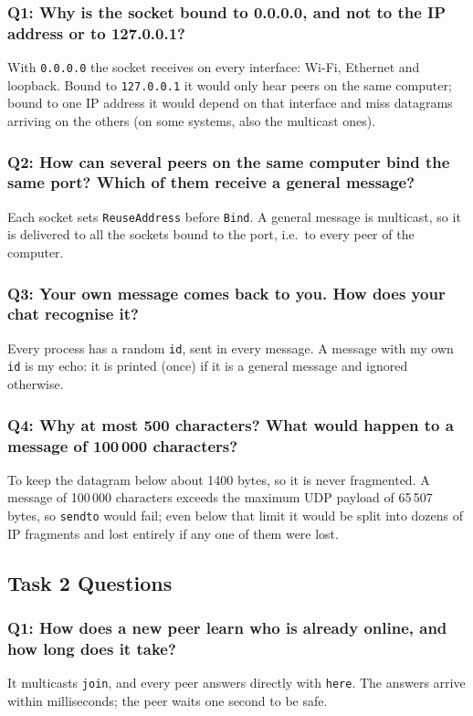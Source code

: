 \documentclass[11pt, a4paper]{article}
\begin{document}
\subsubsection{Q1: Why is the socket bound to 0.0.0.0, and not to the IP address or to 127.0.0.1?}
With \texttt{0.0.0.0} the socket receives on every interface: Wi-Fi, Ethernet and loopback. Bound to \texttt{127.0.0.1} it would only hear peers on the same computer; bound to one IP address it would depend on that interface and miss datagrams arriving on the others (on some systems, also the multicast ones).

\subsubsection{Q2: How can several peers on the same computer bind the same port? Which of them receive a general message?}
Each socket sets \texttt{ReuseAddress} before \texttt{Bind}. A general message is multicast, so it is delivered to all the sockets bound to the port, i.e.\ to every peer of the computer.

\subsubsection{Q3: Your own message comes back to you. How does your chat recognise it?}
Every process has a random \texttt{id}, sent in every message. A message with my own \texttt{id} is my echo: it is printed (once) if it is a general message and ignored otherwise.

\subsubsection{Q4: Why at most 500 characters? What would happen to a message of 100\,000 characters?}
To keep the datagram below about 1400 bytes, so it is never fragmented. A message of 100\,000 characters exceeds the maximum UDP payload of 65\,507 bytes, so \texttt{sendto} would fail; even below that limit it would be split into dozens of IP fragments and lost entirely if any one of them were lost.

\subsection{Task 2 Questions}
\subsubsection{Q1: How does a new peer learn who is already online, and how long does it take?}
It multicasts \texttt{join}, and every peer answers directly with \texttt{here}. The answers arrive within milliseconds; the peer waits one second to be safe.
\end{document}
